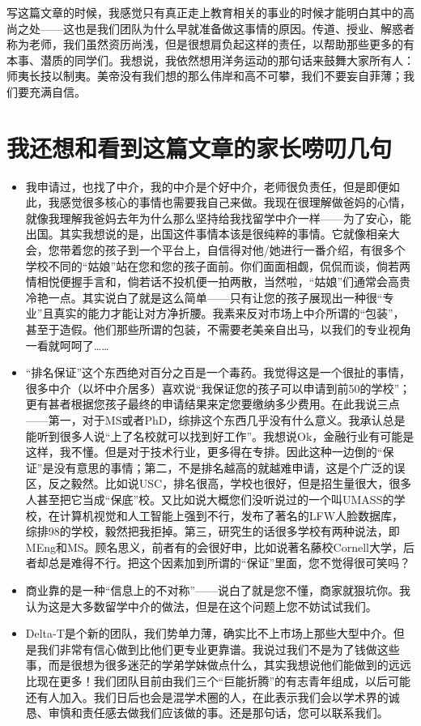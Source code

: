 \documentclass{article}
\begin{document}
写这篇文章的时候，我感觉只有真正走上教育相关的事业的时候才能明白其中的高尚之处——这也是我们团队为什么早就准备做这事情的原因。传道、授业、解惑者称为老师，我们虽然资历尚浅，但是很想肩负起这样的责任，以帮助那些更多的有本事、潜质的同学们。我想说，我依然想用洋务运动的那句话来鼓舞大家所有人：师夷长技以制夷。美帝没有我们想的那么伟岸和高不可攀，我们不要妄自菲薄；我们要充满自信。

\section{我还想和看到这篇文章的家长唠叨几句}
\begin{itemize}
\item{我申请过，也找了中介，我的中介是个好中介，老师很负责任，但是即便如此，我感觉很多核心的事情也需要我自己来做。我现在很理解做爸妈的心情，就像我理解我爸妈去年为什么那么坚持给我找留学中介一样——为了安心，能出国。其实我想说的是，出国这件事情本该是很纯粹的事情。它就像相亲大会，您带着您的孩子到一个平台上，自信得对他/她进行一番介绍，有很多个学校不同的“姑娘”站在您和您的孩子面前。你们面面相觑，侃侃而谈，倘若两情相悦便握手言和，倘若话不投机便一拍两散，当然啦，“姑娘”们通常会高贵冷艳一点。其实说白了就是这么简单——只有让您的孩子展现出一种很“专业”且真实的能力才能让对方净折腰。我素来反对市场上中介所谓的“包装”，甚至于造假。他们那些所谓的包装，不需要老美亲自出马，以我们的专业视角一看就呵呵了……}
\item{“排名保证”这个东西绝对百分之百是一个毒药。我觉得这是一个很扯的事情，很多中介（以坏中介居多）喜欢说“我保证您的孩子可以申请到前50的学校”；更有甚者根据您孩子最终的申请结果来定您要缴纳多少费用。在此我说三点——第一，对于MS或者PhD，综排这个东西几乎没有什么意义。我承认总是能听到很多人说“上了名校就可以找到好工作”。我想说Ok，金融行业有可能是这样，我不懂。但是对于技术行业，更多得在专排。因此这种一边倒的“保证”是没有意思的事情；第二，不是排名越高的就越难申请，这是个广泛的误区，反之毅然。比如说USC，排名很高，学校也很好，但是招生量很大，很多人甚至把它当成“保底”校。又比如说大概您们没听说过的一个叫UMASS的学校，在计算机视觉和人工智能上强到不行，发布了著名的LFW人脸数据库，综排98的学校，毅然把我拒掉。第三，研究生的话很多学校有两种说法，即MEng和MS。顾名思义，前者有的会很好申，比如说著名藤校Cornell大学，后者却总是难得不行。把这个因素加到所谓的“保证”里面，您不觉得很可笑吗？}
\item{商业靠的是一种“信息上的不对称”——说白了就是您不懂，商家就狠坑你。我认为这是大多数留学中介的做法，但是在这个问题上您不妨试试我们。}
\item{Delta-T是个新的团队，我们势单力薄，确实比不上市场上那些大型中介。但是我们非常有信心做到比他们更专业更靠谱。我说过我们不是为了钱做这些事，而是很想为很多迷茫的学弟学妹做点什么，其实我想说他们能做到的远远比现在更多！我们团队目前由我们三个“巨能折腾”的有志青年组成，以后可能还有人加入。我们日后也会是混学术圈的人，在此表示我们会以学术界的诚恳、审慎和责任感去做我们应该做的事。还是那句话，您可以联系我们。}
\end{itemize}
\end{document}
